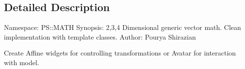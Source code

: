 \subsection{Detailed Description}
Namespace\+: P\+S\+::\+M\+A\+T\+H Synopsis\+: 2,3,4 Dimensional generic vector math. Clean implementation with template classes. Author\+: Pourya Shirazian

Create Affine widgets for controlling transformations or Avatar for interaction with model. 